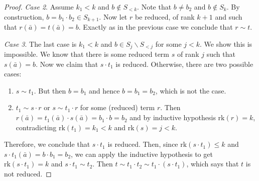 \documentclass[10pt,a4paper]{amsart}
\newcommand{\rk}{\mathrm{rk}}
\begin{document}
\begin{proof}
		\emph{Case 2}. Assume $k_1 <k$ and $b\not \in S_{<k}$.  Note that $b\neq b_2$ and $b\not \in S_k$. By construction, $b= b_1\cdot b_2 \in S_{k+1}$.  Now let $r$ be reduced, of rank $k+1$ and such that $r(\bar{a})= t(\bar{a})=b$. Exactly as in the previous case we conclude that $r\sim t$.
		
		\emph{Case 3}. The last case is $k_1 < k$ and  $b\in S_j\smallsetminus S_{<j}$  for some $j<k$.  We show this is impossible.   We know that there is some reduced term $s$ of rank $j$ such that $s(\bar{a}) = b$. Now we claim that $s\cdot t_1$ is reduced. Otherwise, there are two possible cases:
		\begin{enumerate}
			\item[(i)] $s\sim t_1$.  But then $b= b_1$ and hence $b=b_1 = b_2$, which is not the case.
			\item[(ii)]  $t_1\sim s\cdot r$ or $s\sim t_1\cdot r$  for some (reduced)  term $r$.  Then $r(\bar{a})= t_1(\bar{a})\cdot s(\bar{a})= b_1\cdot b= b_2$  and by inductive hypothesis $\rk(r)=k$, contradicting $\rk(t_1)=k_1<k$ and $\rk(s)= j<k$.
		\end{enumerate}
		Therefore, we conclude that $s\cdot t_1$ is reduced. Then, since $\rk(s\cdot t_1)\leq k$ and $s\cdot  t_1 (\bar{a}) = b\cdot b_1 = b_2$, we can apply the inductive hypothesis to get $\rk(s\cdot t_1)= k$  and  $s\cdot t_1\sim t_2$. Then $t\sim t_1\cdot t_2\sim t_1\cdot (s\cdot t_1)$, which says that $t$ is not reduced.
	\end{proof}
\end{document}
